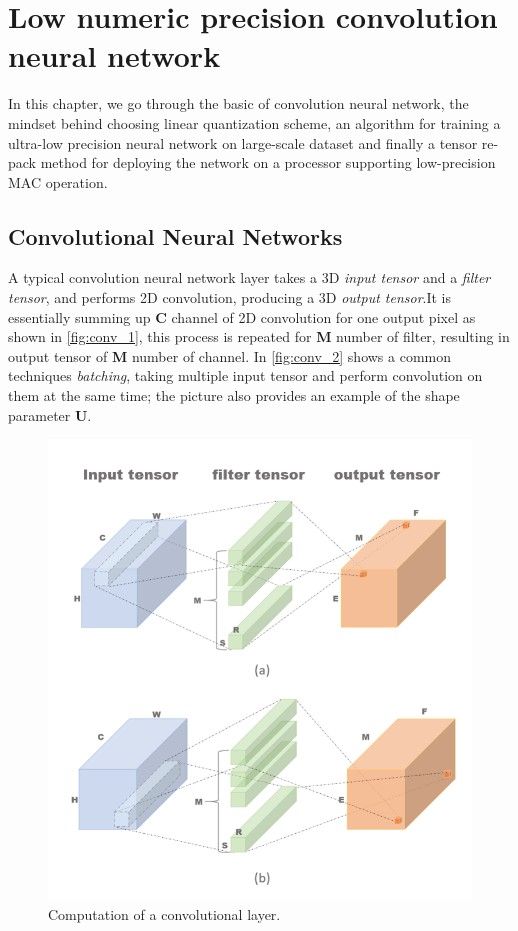 \chapter{Low numeric precision convolution neural network}
\label{ch:low prec NN}


In this chapter, we go through the basic of convolution neural network, the mindset behind choosing linear quantization scheme, an algorithm for training a ultra-low precision neural network on large-scale dataset and finally a tensor re-pack method for deploying the network on a processor supporting low-precision MAC operation.
\section{Convolutional Neural Networks}
A typical convolution neural network layer takes a 3D \textit{input tensor} and a \textit{filter tensor}, and performs 2D convolution, producing a 3D \textit{output tensor}.It is essentially summing up \textbf{C} channel of 2D convolution for one output pixel as shown in \autoref{fig:conv_1}, this process is repeated for \textbf{M} number of filter, resulting in output tensor of \textbf{M} number of channel. 
In \autoref{fig:conv_2} shows a common techniques \textit{batching}, taking multiple input tensor and perform convolution on them at the same time; the picture also provides an example of the shape parameter \textbf{U}.
\begin{figure}
    \centering
    \includegraphics[width=1\linewidth]{inc/3_low_numeric_convolution_neural_network/figure/convolution_1.png}
    \caption{Computation of a convolutional layer.}
    \label{fig:conv_1}
\end{figure}
